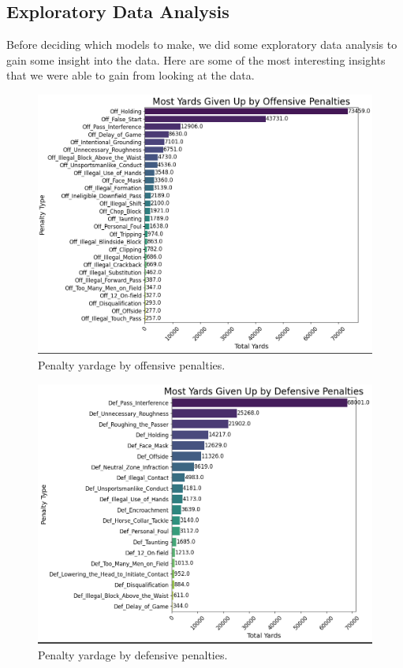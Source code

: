 \documentclass[sigconf, nonacm]{acmart}
\begin{document}
\subsection{Exploratory Data Analysis}

Before deciding which models to make, we did some exploratory data analysis to
gain some insight into the data. Here are some of the most interesting insights
that we were able to gain from looking at the data.

\begin{figure}[h]
  \centering
  \includegraphics[width=\linewidth]{images/eda_3.png}
  \caption{Penalty yardage by offensive penalties.}
\end{figure}

\begin{figure}[h]
  \centering
  \includegraphics[width=\linewidth]{images/eda_4.png}
  \caption{Penalty yardage by defensive penalties.}
\end{figure}
\end{document}
